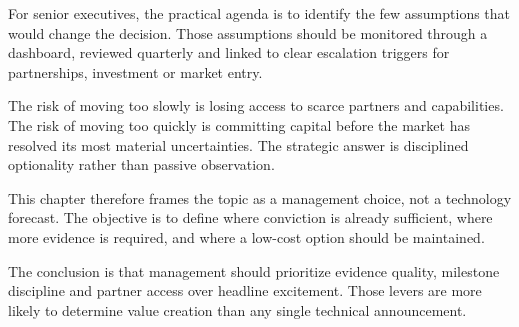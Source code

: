 \documentclass[10pt,a4paper]{article}
\begin{document}
{\small For senior executives, the practical agenda is to identify the few assumptions that would change the decision. Those assumptions should be monitored through a dashboard, reviewed quarterly and linked to clear escalation triggers for partnerships, investment or market entry.}\par
{\small The risk of moving too slowly is losing access to scarce partners and capabilities. The risk of moving too quickly is committing capital before the market has resolved its most material uncertainties. The strategic answer is disciplined optionality rather than passive observation.}\par
{\small This chapter therefore frames the topic as a management choice, not a technology forecast. The objective is to define where conviction is already sufficient, where more evidence is required, and where a low-cost option should be maintained.}\par
{\small The conclusion is that management should prioritize evidence quality, milestone discipline and partner access over headline excitement. Those levers are more likely to determine value creation than any single technical announcement.}\par
\label{chap:5:end}
\end{document}

